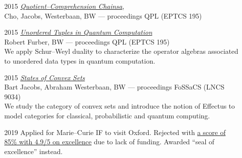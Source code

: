 \documentclass{article}
\newcommand\partitle[1]{\vskip20pt\par\noindent{\textsf{\textbf{#1}}}}
\begin{document}
\begin{itemize}
{    Journal of Mathematical Physics 57 (9)}\\
    We axiomatize sequential measurement to infinite dimensional quantum
    computing.
    \item[2015] \emph{\href{http://eptcs.web.cse.unsw.edu.au/paper.cgi?QPL2015.10}{Quotient--Comprehension Chainsa}}, \\{\footnotesize
        Cho, Jacobs, Westerbaan, BW --- proceedings QPL (EPTCS 195)}
\item[2015] \emph{\href{http://eptcs.web.cse.unsw.edu.au/paper.cgi?QPL2015.15}{Unordered Tuples in Quantum Computation}}\\
    {\footnotesize Robert Furber, BW --- proceedings QPL (EPTCS 195)}\\
        We apply Schur--Weyl duality to characterize the operator algebras
        associated to unordered data types in quantum computation.
    \item[2015] \emph{\href{https://link.springer.com/chapter/10.1007/978-3-662-46678-0_6}{States of Convex Sets}}\\
    {\footnotesize Bart Jacobs, Abraham Westerbaan, BW ---
        proceedings FoSSaCS (LNCS 9034)}\\
    We study the category of convex sets and introduce the notion of Effectus
        to model categories for classical, probabilistic and
        quantum computing.
\end{itemize}


\partitle{Funding}
\begin{itemize}
    \item[2019] Applied for Marie--Curie IF to visit Oxford.
        Rejected with
        \href{http://w-nz.com/~bas/math/msca-eval.pdf}{a score of
            85\% with 4.9/5 on excellence} due to lack of funding.
            Awarded ``seal of excellence'' instead.
\end{itemize}
\end{document}
